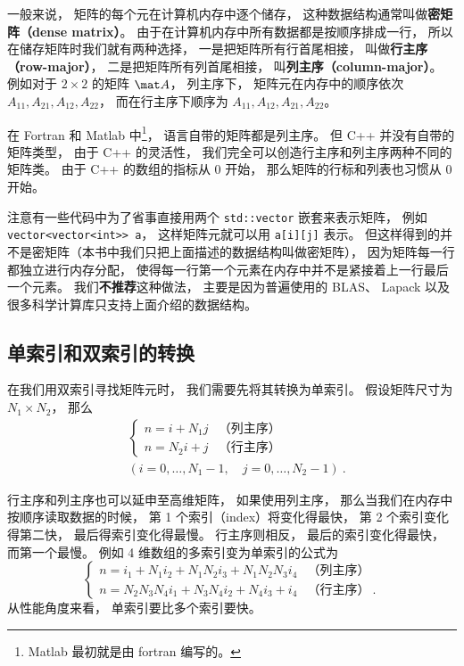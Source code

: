 

一般来说， 矩阵的每个元在计算机内存中逐个储存， 这种数据结构通常叫做\textbf{密矩阵（dense matrix）}。 由于在计算机内存中所有数据都是按顺序排成一行， 所以在储存矩阵时我们就有两种选择， 一是把矩阵所有行首尾相接， 叫做\textbf{行主序（row-major）}， 二是把矩阵所有列首尾相接， 叫\textbf{列主序（column-major）}。 例如对于 $2 \times 2$ 的矩阵 $\mat A$， 列主序下， 矩阵元在内存中的顺序依次 $A_{11}, A_{21}, A_{12}, A_{22}$， 而在行主序下顺序为 $A_{11},A_{12},A_{21},A_{22}$。

在 Fortran 和 Matlab 中\footnote{Matlab 最初就是由 fortran 编写的。}， 语言自带的矩阵都是列主序。 但 C++ 并没有自带的矩阵类型， 由于 C++ 的灵活性， 我们完全可以创造行主序和列主序两种不同的矩阵类。 由于 C++ 的数组的指标从 0 开始， 那么矩阵的行标和列表也习惯从 0 开始。

注意有一些代码中为了省事直接用两个 \verb|std::vector| 嵌套来表示矩阵， 例如 \verb|vector<vector<int>> a|， 这样矩阵元就可以用 \verb|a[i][j]| 表示。 但这样得到的并不是密矩阵（本书中我们只把上面描述的数据结构叫做密矩阵）， 因为矩阵每一行都独立进行内存分配， 使得每一行第一个元素在内存中并不是紧接着上一行最后一个元素。 我们\textbf{不推荐}这种做法， 主要是因为普遍使用的 BLAS、 Lapack 以及很多科学计算库只支持上面介绍的数据结构。

\subsection{单索引和双索引的转换}
在我们用双索引寻找矩阵元时， 我们需要先将其转换为单索引。 假设矩阵尺寸为 $N_1 \times N_2$， 那么
\begin{equation}
\begin{aligned}
&\begin{cases}
n = i + N_1 j  &\text{（列主序）}\\
n = N_2 i + j  &\text{（行主序）}
\end{cases}\\
&(i = 0, \dots, N_1-1,\quad j = 0, \dots, N_2-1)~.
\end{aligned}
\end{equation}

行主序和列主序也可以延申至高维矩阵， 如果使用列主序， 那么当我们在内存中按顺序读取数据的时候， 第 1 个索引（index）将变化得最快， 第 2 个索引变化得第二快， 最后得索引变化得最慢。 行主序则相反， 最后的索引变化得最快， 而第一个最慢。 例如 4 维数组的多索引变为单索引的公式为
\begin{equation}
\begin{cases}
n = i_1 + N_1 i_2 + N_1 N_2 i_3 + N_1 N_2 N_3 i_4  &\text{（列主序）}\\
n = N_2 N_3 N_4 i_1 + N_3 N_4 i_2 + N_4 i_3 + i_4  &\text{（行主序）} ~.
\end{cases}
\end{equation}
从性能角度来看， 单索引要比多个索引要快。


